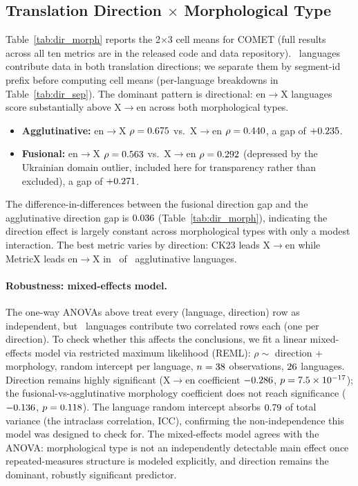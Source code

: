 \documentclass[11pt]{article}
\begin{document}
\subsection{Translation Direction $\times$ Morphological Type}

Table~\ref{tab:dir_morph} reports the 2$\times$3 cell means for COMET (full results across all ten metrics are in the released code and data repository). \NumMixedLangs\ languages contribute data in both translation directions; we separate them by segment-id prefix before computing cell means (per-language breakdowns in Table~\ref{tab:dir_sep}). The dominant pattern is directional: en$\to$X languages score substantially above X$\to$en across both morphological types.
\begin{itemize}
  \item \textbf{Agglutinative:} en$\to$X $\rho=0.675$ vs.\ X$\to$en $\rho=0.440$, a gap of $+0.235$.
  \item \textbf{Fusional:} en$\to$X $\rho=0.563$ vs.\ X$\to$en $\rho=0.292$ (depressed by the Ukrainian domain outlier, included here for transparency rather than excluded), a gap of $+0.271$.
\end{itemize}
The difference-in-differences between the fusional direction gap and the agglutinative direction gap is $0.036$ (Table~\ref{tab:dir_morph}), indicating the direction effect is largely constant across morphological types with only a modest interaction. The best metric varies by direction: CK23 leads X$\to$en while MetricX leads en$\to$X in \WinEntoXAgglutin\ of \WinTotalEntoXAgglutin\ agglutinative languages.

\paragraph{Robustness: mixed-effects model.} The one-way ANOVAs above treat every (language, direction) row as independent, but \NumMixedLangs\ languages contribute two correlated rows each (one per direction). To check whether this affects the conclusions, we fit a linear mixed-effects model via restricted maximum likelihood (REML): $\rho \sim$ direction + morphology, random intercept per language, $n=38$ observations, $26$ languages. Direction remains highly significant (X$\to$en coefficient $-0.286$, $p=7.5\times10^{-17}$); the fusional-vs-agglutinative morphology coefficient does not reach significance ($-0.136$, $p=0.118$). The language random intercept absorbs $0.79$ of total variance (the intraclass correlation, ICC), confirming the non-independence this model was designed to check for. The mixed-effects model agrees with the ANOVA: morphological type is not an independently detectable main effect once repeated-measures structure is modeled explicitly, and direction remains the dominant, robustly significant predictor.
\end{document}
